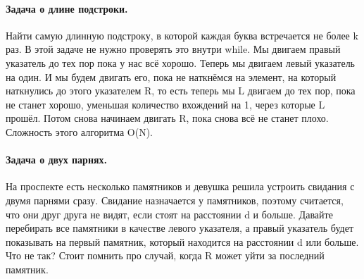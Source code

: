 \documentclass[a4paper,12pt]{article}
\begin{document}
\paragraph{Задача о длине подстроки.}
Найти самую длинную подстроку, в которой каждая буква встречается не более k раз. В этой задаче не нужно проверять это внутри while. Мы двигаем правый указатель до тех пор пока у нас всё хорошо. Теперь мы двигаем левый указатель на один. И мы будем двигать его, пока не наткнёмся на элемент, на который наткнулись до этого указателем R, то есть теперь мы L двигаем до тех пор, пока не станет хорошо, уменьшая количество вхождений на 1, через которые L прошёл. Потом снова начинаем двигать R, пока снова всё не станет плохо. Сложность этого алгоритма O(N). 
\paragraph{Задача о двух парнях.}
На проспекте есть несколько памятников и девушка решила устроить свидания с двумя парнями сразу. Свидание назначается у памятников, поэтому считается, что они друг друга не видят, если стоят на расстоянии d и больше. Давайте перебирать все памятники в качестве левого указателя, а правый указатель будет показывать на первый памятник, который находится на расстоянии d или больше. Что не так? Стоит помнить про случай, когда R может уйти за последний памятник.
\end{document}
